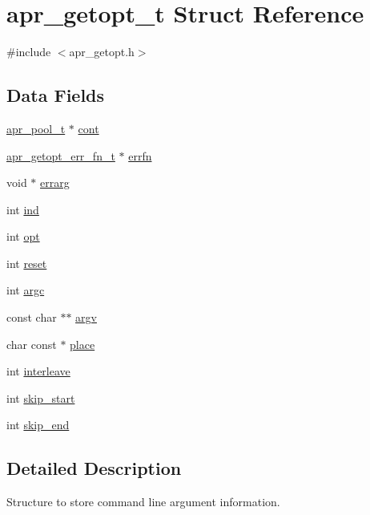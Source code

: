 \hypertarget{structapr__getopt__t}{\section{apr\-\_\-getopt\-\_\-t Struct Reference}
\label{structapr__getopt__t}
}


{\ttfamily \#include $<$apr\-\_\-getopt.\-h$>$}

\subsection*{Data Fields}
\begin{DoxyCompactItemize}
\item 
\hyperlink{group__apr__pools_gaf137f28edcf9a086cd6bc36c20d7cdfb}{apr\-\_\-pool\-\_\-t} $\ast$ \hyperlink{structapr__getopt__t_a63a073fb9c11bb2713b3d7f967e95a24}{cont}
\item 
\hyperlink{group__apr__getopt_gae82318936f08cc3531ce9b0856422f27}{apr\-\_\-getopt\-\_\-err\-\_\-fn\-\_\-t} $\ast$ \hyperlink{structapr__getopt__t_a6bf3fd7ad92d1f0161cd895e1ad50d06}{errfn}
\item 
void $\ast$ \hyperlink{structapr__getopt__t_a46db55c58789ab7fa99bb49544b0776e}{errarg}
\item 
int \hyperlink{structapr__getopt__t_ab04d49d670f095c3244dc9792b70ff07}{ind}
\item 
int \hyperlink{structapr__getopt__t_a4f842391b8f8f19e562584fdd29d0654}{opt}
\item 
int \hyperlink{structapr__getopt__t_abc4e72bc761666c0b0d9015c3b0de8c3}{reset}
\item 
int \hyperlink{structapr__getopt__t_a58aeb33137aabdd5a00efbde05652094}{argc}
\item 
const char $\ast$$\ast$ \hyperlink{structapr__getopt__t_a296c27d8db2fe6d4b88c5c7a85c40c02}{argv}
\item 
char const $\ast$ \hyperlink{structapr__getopt__t_a87961387d1c71bebfbdf69c7f392d2d5}{place}
\item 
int \hyperlink{structapr__getopt__t_a771dbef87345c731845dd63723fb34db}{interleave}
\item 
int \hyperlink{structapr__getopt__t_a0cd41eedf9ed82bf5d9dcc3491ee67dd}{skip\-\_\-start}
\item 
int \hyperlink{structapr__getopt__t_ae9e7e6eb1576820c7dc6e589cc3a28b7}{skip\-\_\-end}
\end{DoxyCompactItemize}


\subsection{Detailed Description}
Structure to store command line argument information. 

